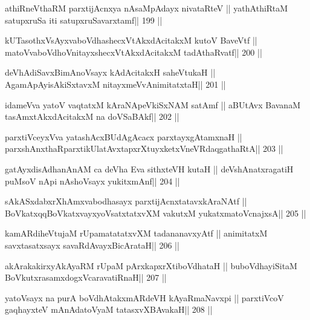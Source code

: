 \begin{shl}
athiRneV\s thaRM parxtijAcnxya nAsaMpAdayx nivataRteV ||
yathAthiRtaM satupxruSa  iti satupxruSavarxtamf\hfill || 199 ||
\end{shl}

\begin{shl}
kUTasothxV\s sAyxvaboVdhashecxVtAkxdAcitakxM kutoV BaveVtf ||
matoV\s vaboVdhoV\s nitayxshecxVtAkxdAcitakxM tadA\s thaRvatf\hfill || 200 ||
\end{shl}

\begin{shl}
deVhAdiSavxBimAnoV\s sayx kAdAcitakxH saheVtukaH ||
AgamApAyisAkiSxtavxM nitayxmeVvAnimitatxtaH\hfill || 201 ||
\end{shl}

\begin{shl}
idameVva yatoV vaqtatxM kAraNApeVkiSxNAM satAmf ||
aBUtAvx BavanaM tasAmxtAkxdAcitakxM na doVSaBAkf\hfill || 202 ||
\end{shl}

\begin{shl}
parxtiVceyxVva yatashAcxBUdAgAcacx parxtayxgAtamxnaH ||
parxshAnxthaRparxtikUlatAvxtapxrXtuyxketxVneVRdaqgathaRtA\hfill || 203 ||
\end{shl}

\begin{shl}
gatAyxdisAdhanAnAM ca deVha Eva sithxteVH kutaH ||
deVshAnatxragatiH puMsoV nApi nAshoV\s sayx yukitxmAnf\hfill || 204 ||
\end{shl}

\begin{shl}
sAkASxdabxrXhAmxvabodhasayx parxtijAcnxtatavxkAraNAtf ||
BoVkatxqqBoVkatxvayxyoVsatxtatxvXM vakutxM yukatxmatoV\s cnajxsA\hfill || 205 ||
\end{shl}

\begin{shl}
kamARdiheVtujaM rUpamatatatxvXM tadananavxyAtf ||
animitatxM savxtasatxsayx savaRdA\s vayxBicArataH\hfill || 206 ||
\end{shl}

\begin{shl}
akArakakirxyAkAyaRM rUpaM pArxkapxrXtiboVdhataH ||
buboVdhayiSitaM BoVkutxrasamxdogxVcaravatiRnaH\hfill || 207 ||
\end{shl}

\begin{shl}
yatoV\s sayx na purA boVdhAtakxmARdeVH kAyaRmaNavxpi ||
parxtiVcoV gaqhayxteV mAnAdatoV\s yaM tatasxvXBAvakaH\hfill || 208 ||
\end{shl}

